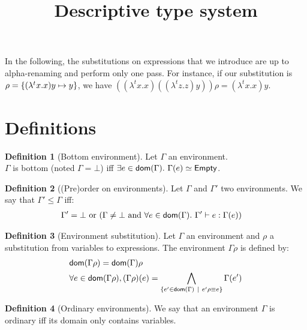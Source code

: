 \documentclass[a4paper]{article}
\title{\vspace{1.5cm}Descriptive type system}
\author{}
\date{\vspace{-5ex}}
\theoremstyle{definition}
\newtheorem{definition}{Definition}
\begin{document}
  \maketitle

  In the following, the substitutions on expressions that we introduce are up to alpha-renaming and perform only one pass.
  For instance, if our substitution is $\rho=\{(\lambda^t x. x) y \mapsto y\}$, we have $((\lambda^t x. x)((\lambda^t z. z) y))\rho = (\lambda^t x. x) y$.
  
    \section{Definitions}

    \begin{definition}[Bottom environment]
      Let $\Gamma$ an environment.\\
      $\Gamma$ is bottom (noted $\Gamma = \bot$) iff $\exists e\in\dom\Gamma.\ \Gamma(e)\simeq\Empty$.
    \end{definition}

      \begin{definition}[(Pre)order on environments]
        Let $\Gamma$ and $\Gamma'$ two environments. We say that $\Gamma' \leq \Gamma$ iff:
        \begin{align*}
          &\Gamma'=\bot \text{ or } (\Gamma\neq\bot \text{ and } \forall e \in \textsf{dom}(\Gamma).\ \Gamma' \vdash e : \Gamma(e))
        \end{align*}
      \end{definition}
    
      \begin{definition}[Environment substitution]
        Let $\Gamma$ an environment and $\rho$ a substitution from variables to expressions.
        The environment $\Gamma\rho$ is defined by:
        \begin{align*}
          &\textsf{dom}(\Gamma\rho) = \textsf{dom}(\Gamma) \rho\\
          &\forall e \in \textsf{dom}(\Gamma\rho), (\Gamma\rho)(e) = \bigwedge_{\{e' \in \textsf{dom}(\Gamma) ~|~ e'\rho\equiv e\}}\Gamma(e')
        \end{align*}
      \end{definition}
    
      \begin{definition}[Ordinary environments]
        We say that an environment $\Gamma$ is ordinary iff its domain only contains variables.
      \end{definition}
\end{document}
